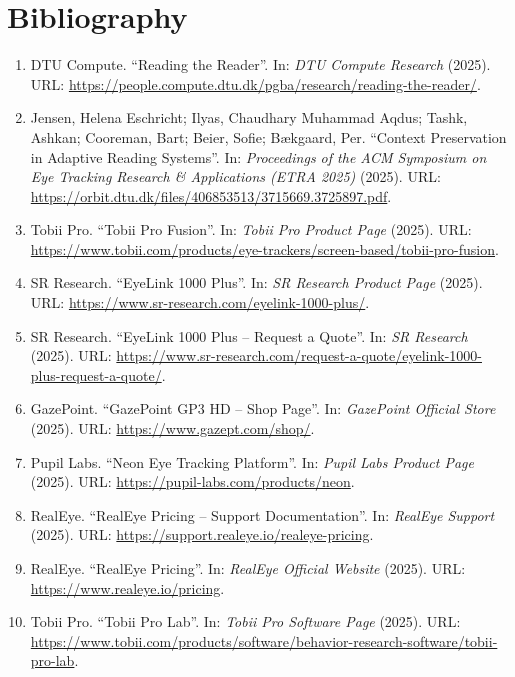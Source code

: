 \chapter{Bibliography}
\begin{enumerate}

\item DTU Compute. “Reading the Reader”. In: \textit{DTU Compute Research} (2025). URL: \url{https://people.compute.dtu.dk/pgba/research/reading-the-reader/}.

\item Jensen, Helena Eschricht; Ilyas, Chaudhary Muhammad Aqdus; Tashk, Ashkan; Cooreman, Bart; Beier, Sofie; Bækgaard, Per. “Context Preservation in Adaptive Reading Systems”. In: \textit{Proceedings of the ACM Symposium on Eye Tracking Research \& Applications (ETRA 2025)} (2025). URL: \url{https://orbit.dtu.dk/files/406853513/3715669.3725897.pdf}.

\item Tobii Pro. “Tobii Pro Fusion”. In: \textit{Tobii Pro Product Page} (2025). URL: \url{https://www.tobii.com/products/eye-trackers/screen-based/tobii-pro-fusion}.

\item SR Research. “EyeLink 1000 Plus”. In: \textit{SR Research Product Page} (2025). URL: \url{https://www.sr-research.com/eyelink-1000-plus/}.

\item SR Research. “EyeLink 1000 Plus – Request a Quote”. In: \textit{SR Research} (2025). URL: \url{https://www.sr-research.com/request-a-quote/eyelink-1000-plus-request-a-quote/}.

\item GazePoint. “GazePoint GP3 HD – Shop Page”. In: \textit{GazePoint Official Store} (2025). URL: \url{https://www.gazept.com/shop/}.

\item Pupil Labs. “Neon Eye Tracking Platform”. In: \textit{Pupil Labs Product Page} (2025). URL: \url{https://pupil-labs.com/products/neon}.

\item RealEye. “RealEye Pricing – Support Documentation”. In: \textit{RealEye Support} (2025). URL: \url{https://support.realeye.io/realeye-pricing}.

\item RealEye. “RealEye Pricing”. In: \textit{RealEye Official Website} (2025). URL: \url{https://www.realeye.io/pricing}.

\item Tobii Pro. “Tobii Pro Lab”. In: \textit{Tobii Pro Software Page} (2025). URL: \url{https://www.tobii.com/products/software/behavior-research-software/tobii-pro-lab}.


\end{enumerate}
